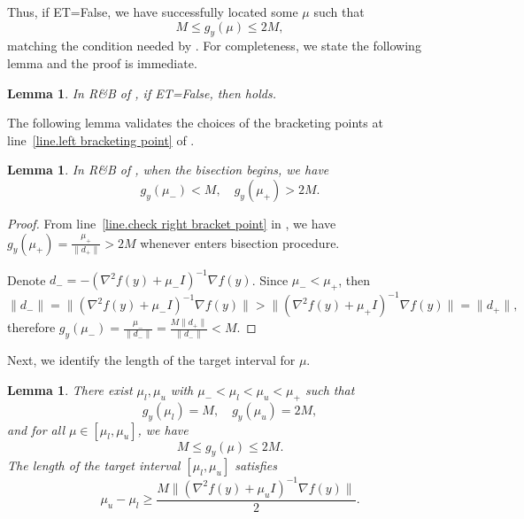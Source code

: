 \documentclass{article}
\newtheorem{lemma}[theorem]{Lemma}
\numberwithin{equation}{section}
\numberwithin{equation}{section}
\begin{document}
Thus, if ET=False, we have successfully located some $\mu$ such that
\begin{equation*}
    M \leq g_y(\mu) \leq 2M,
\end{equation*}
matching the condition needed by . For completeness, we state the following lemma and the proof is immediate.
\begin{lemma}\label{lem.rboutput}
    In \textnormal{R\&B} of , if ET=False, then  holds.
\end{lemma}
The following lemma validates the choices of the bracketing points at line~\ref{line.left bracketing point} of .
\begin{lemma}
    \label{lem.valid bracketing}
    In \textnormal{R\&B} of , when the bisection begins, we have
    \begin{equation*}
        g_y(\mu_-) < M, \quad g_y(\mu_+) >2M.
    \end{equation*}
\end{lemma}
\begin{proof}
    From line~\ref{line.check right bracket point} in , we have $g_y(\mu_+)=\frac{\mu_+}{\|d_+\|} >2M$ whenever  enters bisection procedure.

    Denote $d_- = -\left(\nabla^2 f(y)+\mu_-I\right)^{-1}\nabla f(y)$. Since $\mu_- <\mu_+$, then
    \begin{equation*}
        \|d_-\|=\| (\nabla ^2 f(y)+\mu_- I )^{-1} \nabla f(y)\|>\| (\nabla ^2 f(y)+\mu_+ I )^{-1} \nabla f(y)\| = \|d_+\|,
    \end{equation*}
    therefore $g_y(\mu_-) = \frac{\mu_-}{\|d_-\|}=\frac{M\|d_+\|}{\|d_-\|}< M$.
\end{proof}
Next, we identify the length of the target interval for $\mu$.
\begin{lemma}
    \label{lem.bound target interval}
    There exist $\mu_l,\mu_u$ with $\mu_-<\mu_l<\mu_u<\mu_+$ such that
    \begin{equation}\label{eq.target interval bracketing points}
        g_{y}(\mu_l)=M, \quad g_{y}(\mu_u)=2M,
    \end{equation}
    and for all $\mu\in[\mu_l,\mu_u]$, we have
    \begin{equation*}
        M\leq g_y(\mu) \leq2M.
    \end{equation*}
    The length of the target interval $[\mu_l,\mu_u]$ satisfies
    \begin{equation}
        \label{eq.bound target interval}
        \mu_u-\mu_l \geq \frac{M\| (\nabla ^2 f(y)+\mu_u I  )^{-1}\nabla f(y)\|}{2}.
    \end{equation}
\end{lemma}
\end{document}
